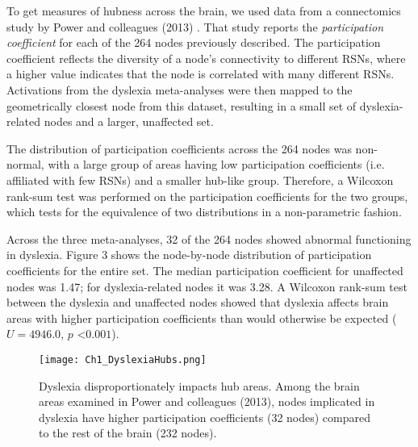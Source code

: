 To get measures of hubness across the brain, we used data from a connectomics study by Power and colleagues (2013) \cite{Power2013}. That study reports the \textit{participation coefficient} for each of the 264 nodes previously described. The participation coefficient reflects the diversity of a node's connectivity to different RSNs, where a higher value indicates that the node is correlated with many different RSNs. Activations from the dyslexia meta-analyses were then mapped to the geometrically closest node from this dataset, resulting in a small set of dyslexia-related nodes and a larger, unaffected set.

The distribution of participation coefficients across the 264 nodes was non-normal, with a large group of areas having low participation coefficients (i.e. affiliated with few RSNs) and a smaller hub-like group. Therefore, a Wilcoxon rank-sum test was performed on the participation coefficients for the two groups, which tests for the equivalence of two distributions in a non-parametric fashion.

Across the three meta-analyses, 32 of the 264 nodes showed abnormal functioning in dyslexia. Figure 3 shows the node-by-node distribution of participation coefficients for the entire set. The median participation coefficient for unaffected nodes was 1.47; for dyslexia-related nodes it was 3.28. A Wilcoxon rank-sum test between the dyslexia and unaffected nodes showed that dyslexia affects brain areas with higher participation coefficients than would otherwise be expected ($U = 4946.0$, $p$ \textless $0.001$). 


\begin{figure}[h!]
\centering
\texttt{[image: Ch1\_DyslexiaHubs.png]}
    \caption[Dyslexia disproportionately impacts hub areas.]{Dyslexia disproportionately impacts hub areas. Among the brain areas examined in Power and colleagues (2013), nodes implicated in dyslexia have higher participation coefficients (32 nodes) compared to the rest of the brain (232 nodes).}
\label{fig:texlogo}
\end{figure}